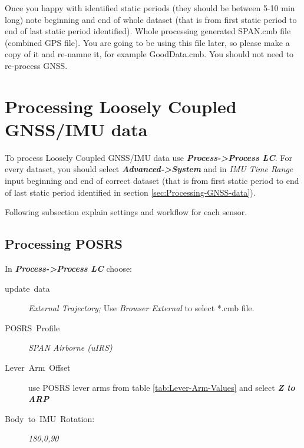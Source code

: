 \documentclass[british,DIV=calc, paper=a4, fontsize=12pt, onecolumn]{scrartcl}
\begin{document}
Once you happy with identified static periods (they should be between 5-10 min long) note beginning and end of whole dataset (that is from first static period to end of last static period identified). Whole processing  generated SPAN.cmb file (combined GPS file). You are going to be using this file later, so please make a copy of it and re-namne it, for example GoodData.cmb. You should not need to re-process GNSS.



\section{Processing Loosely Coupled GNSS/IMU data\label{sec:Processing-Loosely-Coupled}}

To process  Loosely Coupled GNSS/IMU data use \textbf{\emph{Process->Process LC}}. For every dataset, you should select \textbf{\emph{Advanced->System}} and in \textit{IMU Time Range} input beginning and end of correct dataset (that is from first static period to end of last static period identified in section \ref{sec:Processing-GNSS-data}).


Following subsection explain settings and workflow for each sensor.

\subsection{Processing POSRS\label{sub:Processing-POSRS}}

In \textbf{\emph{Process->Process LC}} choose:
\begin{description}
	\item [{update~data}] \emph{External Trajectory; }Use \emph{Browser External} to select {*}.cmb file.
	\item [{POSRS~Profile}] \emph{SPAN Airborne (uIRS)}
	\item [{Lever~Arm~Offset}] use POSRS lever arms from table \ref{tab:Lever-Arm-Values} and select \textbf{\emph{Z to ARP}}
	\item [{Body~to~IMU~Rotation:}] \emph{180,0,90 }
	\end{description}
	
\end{document}
